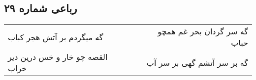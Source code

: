 \begin{center}
\section*{رباعی شماره ۲۹}
\label{sec:sh029}
\begin{longtable}{l p{0.5cm} r}
گه میگردم بر آتش هجر کباب
&&
گه سر گردان بحر غم همچو حباب
\\
القصه چو خار و خس درین دیر خراب
&&
گه بر سر آتشم گهی بر سر آب
\\
\end{longtable}
\end{center}
